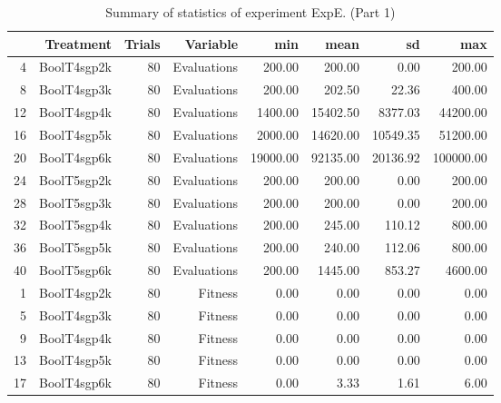 \begin{table}[ht]
\centering
\begin{tabular}{rrrrrrrr}
  \hline
 & Treatment & Trials & Variable & min & mean & sd & max \\ 
  \hline
4 & BoolT4sgp2k &  80 & Evaluations & 200.00 & 200.00 & 0.00 & 200.00 \\ 
  8 & BoolT4sgp3k &  80 & Evaluations & 200.00 & 202.50 & 22.36 & 400.00 \\ 
  12 & BoolT4sgp4k &  80 & Evaluations & 1400.00 & 15402.50 & 8377.03 & 44200.00 \\ 
  16 & BoolT4sgp5k &  80 & Evaluations & 2000.00 & 14620.00 & 10549.35 & 51200.00 \\ 
  20 & BoolT4sgp6k &  80 & Evaluations & 19000.00 & 92135.00 & 20136.92 & 100000.00 \\ 
  24 & BoolT5sgp2k &  80 & Evaluations & 200.00 & 200.00 & 0.00 & 200.00 \\ 
  28 & BoolT5sgp3k &  80 & Evaluations & 200.00 & 200.00 & 0.00 & 200.00 \\ 
  32 & BoolT5sgp4k &  80 & Evaluations & 200.00 & 245.00 & 110.12 & 800.00 \\ 
  36 & BoolT5sgp5k &  80 & Evaluations & 200.00 & 240.00 & 112.06 & 800.00 \\ 
  40 & BoolT5sgp6k &  80 & Evaluations & 200.00 & 1445.00 & 853.27 & 4600.00 \\ 
  1 & BoolT4sgp2k &  80 & Fitness & 0.00 & 0.00 & 0.00 & 0.00 \\ 
  5 & BoolT4sgp3k &  80 & Fitness & 0.00 & 0.00 & 0.00 & 0.00 \\ 
  9 & BoolT4sgp4k &  80 & Fitness & 0.00 & 0.00 & 0.00 & 0.00 \\ 
  13 & BoolT4sgp5k &  80 & Fitness & 0.00 & 0.00 & 0.00 & 0.00 \\ 
  17 & BoolT4sgp6k &  80 & Fitness & 0.00 & 3.33 & 1.61 & 6.00 \\ 
   \hline
\end{tabular}
\caption{Summary of statistics of experiment ExpE. (Part 1)} 
\end{table}
